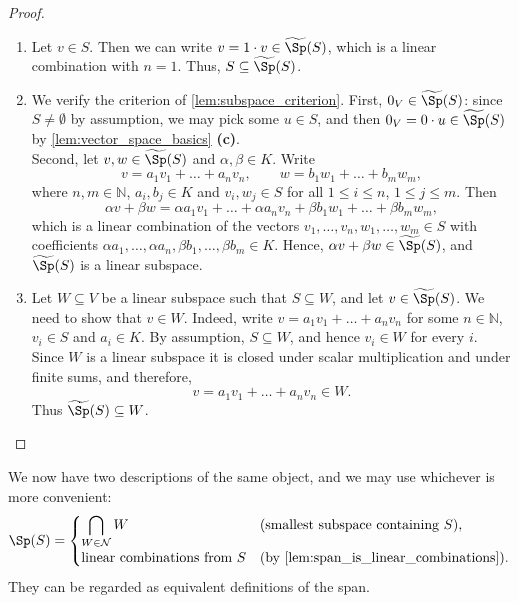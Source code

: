 \begin{proof}
\begin{enumerate}[label=\textbf{(\alph*)}]
    \item Let $v \in S$. Then we can write $v = 1 \cdot v \in \widetilde{\Sp}(S)$, which is a linear combination with $n = 1$. Thus, $S \subseteq \widetilde{\Sp}(S)$.

    \item We verify the criterion of \cref{lem:subspace_criterion}. First, $0_V \in \widetilde{\Sp}(S)$: since $S \ne \emptyset$ by assumption, we may pick some $u \in S$, and then $0_V = 0 \cdot u \in \widetilde{\Sp}(S)$ by \cref{lem:vector_space_basics} \textbf{(c)}. \\
    Second, let $v, w \in \widetilde{\Sp}(S)$ and $\alpha, \beta \in K$. Write
    \[
    v = a_1 v_1 + \dots + a_n v_n, \qquad w = b_1 w_1 + \dots + b_m w_m,
    \]
    where $n, m \in \mathbb{N}$, $a_i, b_j \in K$ and $v_i, w_j \in S$ for all $1 \le i \le n$, $1 \le j \le m$. Then
    \[
    \alpha v + \beta w = \alpha a_1 v_1 + \dots + \alpha a_n v_n + \beta b_1 w_1 + \dots + \beta b_m w_m,
    \]
    which is a linear combination of the vectors $v_1, \dots, v_n, w_1, \dots, w_m \in S$ with coefficients $\alpha a_1, \dots, \alpha a_n, \beta b_1, \dots, \beta b_m \in K$. Hence, $\alpha v + \beta w \in \widetilde{\Sp}(S)$, and $\widetilde{\Sp}(S)$ is a linear subspace.

    \item Let $W \subseteq V$ be a linear subspace such that $S \subseteq W$, and let $v \in \widetilde{\Sp}(S)$. We need to show that $v \in W$. Indeed, write $v = a_1 v_1 + \dots + a_n v_n$ for some $n \in \mathbb{N}$, $v_i \in S$ and $a_i \in K$. By assumption, $S \subseteq W$, and hence $v_i \in W$ for every $i$. Since $W$ is a linear subspace it is closed under scalar multiplication and under finite sums, and therefore,
    \[
    v = a_1 v_1 + \dots + a_n v_n \in W.
    \]
    Thus $\widetilde{\Sp}(S) \subseteq W$. \qedhere
\end{enumerate}
\end{proof}

\begin{summary}
\label{sum:two_definitions_of_span}
We now have two descriptions of the same object, and we may use whichever is more convenient:
\[
\Sp(S) =
\begin{cases}
\displaystyle \bigcap_{W \in \mathcal{N}} W & \text{(smallest subspace containing } S), \\[2ex]
\text{linear combinations from } S & \text{(by \cref{lem:span_is_linear_combinations}).}
\end{cases}
\]
They can be regarded as equivalent definitions of the span.
\end{summary}

